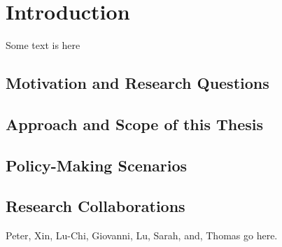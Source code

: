 \chapter{Introduction}

Some text is here

\section{Motivation and Research Questions}

\section{Approach and Scope of this Thesis}

\section{Policy-Making Scenarios}

\section{Research Collaborations}
Peter, Xin, Lu-Chi, Giovanni, Lu, Sarah, and, Thomas go here.